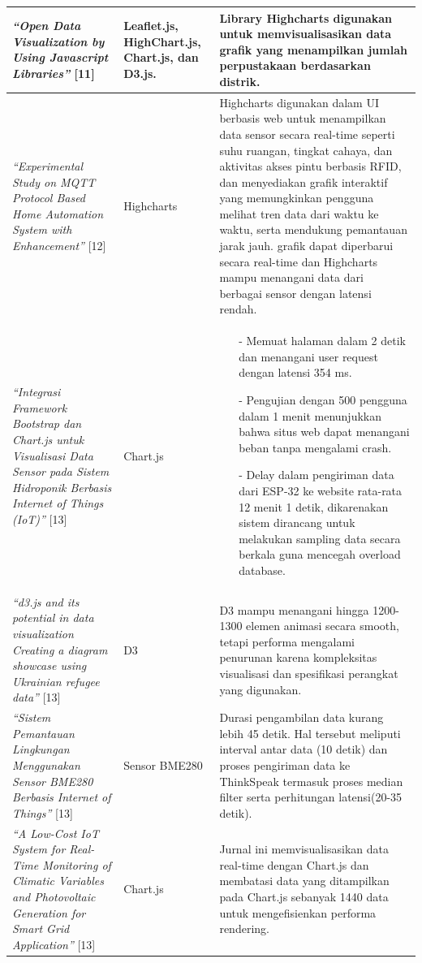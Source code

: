 \begin{longtable}{|p{}|
		p{}|
		p{}|}
	\textit{“Open Data Visualization by Using Javascript Libraries”} [11] &Leaflet.js, HighChart.js, Chart.js, dan D3.js. & Library Highcharts digunakan untuk memvisualisasikan data grafik yang menampilkan jumlah perpustakaan berdasarkan distrik. \\ \hline
	\textit{“Experimental Study on MQTT Protocol Based Home Automation System with Enhancement”} [12] & Highcharts & Highcharts digunakan dalam UI berbasis web untuk menampilkan data sensor secara real-time seperti suhu ruangan, tingkat cahaya, dan aktivitas akses pintu berbasis RFID, dan menyediakan grafik interaktif yang memungkinkan pengguna melihat tren data dari waktu ke waktu, serta mendukung pemantauan jarak jauh. grafik dapat diperbarui secara real-time dan Highcharts mampu menangani data dari berbagai sensor dengan latensi rendah.\\ \hline
	\textit{“Integrasi Framework Bootstrap dan Chart.js untuk Visualisasi Data Sensor pada Sistem Hidroponik Berbasis Internet of Things (IoT)”} [13] & Chart.js & 
	\begin{itemize}
		\item[-] Memuat halaman dalam 2 detik dan menangani user request dengan latensi 354 ms. 
		\item[-]  Pengujian dengan 500 pengguna dalam 1 menit menunjukkan bahwa situs web dapat menangani beban tanpa mengalami crash.
		\item[-] Delay dalam pengiriman data dari ESP-32 ke website rata-rata 12 menit 1 detik, dikarenakan sistem dirancang untuk melakukan sampling data secara berkala guna mencegah overload database.
	\end{itemize} \\ \hline
	\textit{“d3.js and its potential in data visualization Creating a diagram showcase using Ukrainian refugee data”} [13] & D3 & 
	D3 mampu menangani hingga 1200-1300 elemen animasi secara smooth, tetapi performa mengalami penurunan karena kompleksitas visualisasi dan spesifikasi perangkat yang digunakan. \\ \hline
	\textit{“Sistem Pemantauan Lingkungan Menggunakan Sensor BME280 Berbasis Internet of Things”} [13] & Sensor BME280 & 
	Durasi pengambilan data kurang lebih 45 detik. Hal tersebut meliputi interval antar data (10 detik) dan proses pengiriman data ke ThinkSpeak termasuk proses median filter serta perhitungan latensi(20-35 detik). \\ \hline
	\textit{“A Low-Cost IoT System for Real-Time Monitoring of Climatic Variables and Photovoltaic Generation for Smart Grid Application”} [13] & Chart.js & 
	 Jurnal ini memvisualisasikan data real-time dengan Chart.js dan membatasi data yang ditampilkan pada Chart.js sebanyak 1440 data untuk mengefisienkan performa rendering. \\ \hline
\end{longtable}

